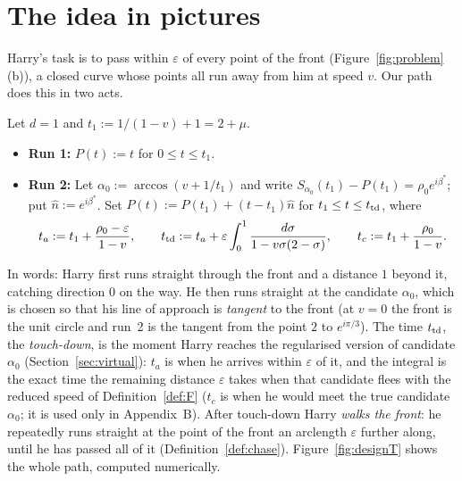 \section{The idea in pictures}\label{sec:idea}

Harry's task is to pass within $\varepsilon$ of every point of the front (Figure~\ref{fig:problem}(b)), a closed curve
whose points all run away from him at speed $v$. Our path does this in two acts.

\begin{definition}[Design~T]\label{def:designT}
Let $d=1$ and $t_1:=1/(1-v)+1=2+\mu$.
\begin{itemize}
\setlength{\itemsep}{1pt}\setlength{\parskip}{0pt}
\item \textbf{Run 1:} $P(t):=t$ for $0\le t\le t_1$.
\item \textbf{Run 2:} Let $\alpha_0:=\arccos(v+1/t_1)$ and write $S_{\alpha_0}(t_1)-P(t_1)=\rho_0e^{i\beta^*}$; put
$\hat n:=e^{i\beta^*}$. Set $P(t):=P(t_1)+(t-t_1)\hat n$ for $t_1\le t\le t_{\mathrm{td}}$, where
\[
t_a:=t_1+\frac{\rho_0-\varepsilon}{1-v},\qquad t_{\mathrm{td}}:=t_a+\varepsilon\int_0^1\frac{d\sigma}{1-v\sigma(2-\sigma)},
\qquad t_c:=t_1+\frac{\rho_0}{1-v}.
\]
\end{itemize}
\end{definition}

In words: Harry first runs straight through the front and a distance $1$ beyond it, catching direction $0$ on the way.
He then runs straight at the candidate $\alpha_0$, which is chosen so that his line of approach is \emph{tangent} to the
front (at $v=0$ the front is the unit circle and run~2 is the tangent from the point $2$ to $e^{i\pi/3}$). The time
$t_{\mathrm{td}}$, the \emph{touch-down}, is the moment Harry reaches the regularised version of candidate $\alpha_0$
(Section~\ref{sec:virtual}): $t_a$ is when he arrives within $\varepsilon$ of it, and the integral is the exact time the
remaining distance $\varepsilon$ takes when that candidate flees with the reduced speed of Definition~\ref{def:F}
($t_c$ is when he would meet the true candidate $\alpha_0$; it is used only in Appendix~B). After
touch-down Harry \emph{walks the front}: he repeatedly runs straight at the point of the front an arclength
$\varepsilon$ further along, until he has passed all of it (Definition~\ref{def:chase}). Figure~\ref{fig:designT} shows
the whole path, computed numerically.

